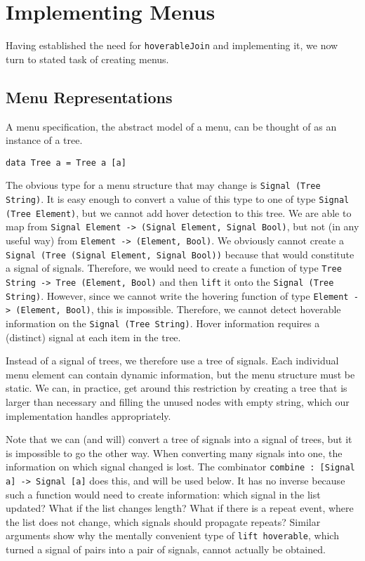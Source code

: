 \documentclass{article}
\begin{document}
\section{Implementing Menus}\label{implementing-menus}

Having established the need for \texttt{hoverableJoin} and implementing it, we
now turn to stated task of creating menus.
\subsection{Menu Representations}\label{menu-representations}

A menu specification, the abstract model of a menu, can be thought of as an
instance of a tree.

\texttt{data Tree a = Tree a [a]}

The obvious type for a menu structure that may change is \texttt{Signal (Tree
String)}.  It is easy enough to convert a value of this type to one of type
\texttt{Signal (Tree Element)}, but we cannot add hover detection to this tree.
We are able to map from \texttt{Signal Element -> (Signal Element, Signal
Bool)}, but not (in any useful way) from \texttt{Element -> (Element, Bool)}. We
obviously cannot create a \texttt{Signal (Tree (Signal Element, Signal Bool))}
because that would constitute a signal of signals.  Therefore, we would need to
create a function of type \texttt{Tree String -> Tree (Element, Bool)} and then
\texttt{lift} it onto the \texttt{Signal (Tree String)}. However, since we
cannot write the hovering function of type \texttt{Element -> (Element, Bool)},
this is impossible.  Therefore, we cannot detect hoverable information on the
\texttt{Signal (Tree String)}. Hover information requires a (distinct) signal at
each item in the tree.

Instead of a signal of trees, we therefore use a tree of signals. Each
individual menu element can contain dynamic information, but the menu structure
must be static. We can, in practice, get around this restriction by creating a
tree that is larger than necessary and filling the unused nodes with empty
string, which our implementation handles appropriately.

Note that we can (and will) convert a tree of signals into a signal of trees,
but it is impossible to go the other way. When converting many signals into one,
the information on which signal changed is lost. The combinator \texttt{combine
    : {[}Signal a{]} -> Signal {[}a{]}} does this, and will be used below. It
    has no inverse because such a function would need to create information:
    which signal in the list updated? What if the list changes length? What if
    there is a repeat event, where the list does not change, which signals
    should propagate repeats? Similar arguments show why the mentally convenient
    type of \texttt{lift hoverable}, which turned a signal of pairs into a pair
    of signals, cannot actually be obtained.
\end{document}
